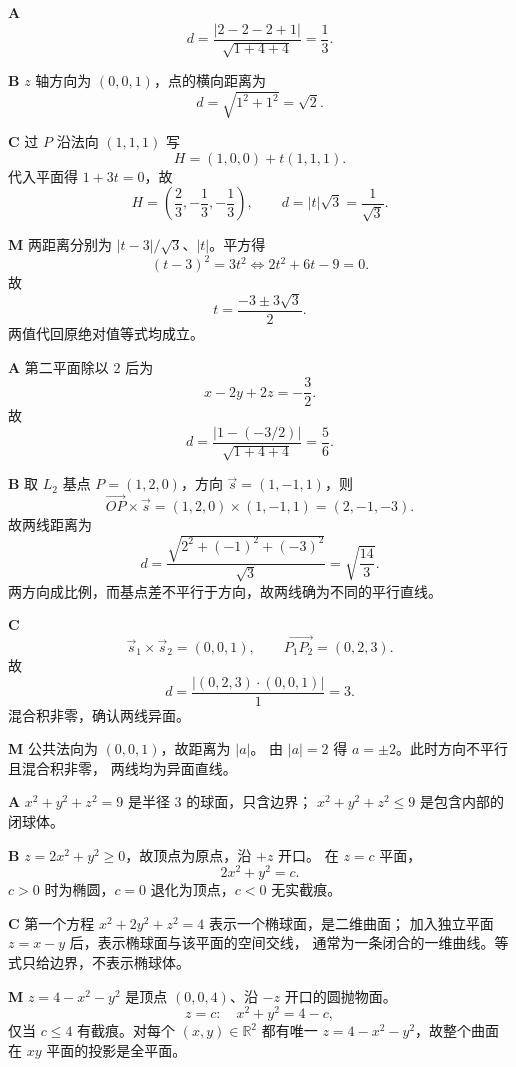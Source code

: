 \begin{solutionBox}
\textbf{A}\quad
\[
d=\frac{|2-2-2+1|}{\sqrt{1+4+4}}=\frac13.
\]

\textbf{B}\quad
\(z\) 轴方向为 \((0,0,1)\)，点的横向距离为
\[
d=\sqrt{1^2+1^2}=\sqrt2.
\]

\textbf{C}\quad
过 \(P\) 沿法向 \((1,1,1)\) 写
\[
H=(1,0,0)+t(1,1,1).
\]
代入平面得 \(1+3t=0\)，故
\[
H=\left(\frac23,-\frac13,-\frac13\right),\qquad
d=|t|\sqrt3=\frac1{\sqrt3}.
\]

\textbf{M}\quad
两距离分别为 \(|t-3|/\sqrt3\)、\(|t|\)。平方得
\[
(t-3)^2=3t^2
\Longleftrightarrow 2t^2+6t-9=0.
\]
故
\[
t=\frac{-3\pm3\sqrt3}{2}.
\]
两值代回原绝对值等式均成立。
\end{solutionBox}

\begin{solutionBox}
\textbf{A}\quad
第二平面除以 \(2\) 后为
\[
x-2y+2z=-\frac32.
\]
故
\[
d=\frac{|1-(-3/2)|}{\sqrt{1+4+4}}=\frac56.
\]

\textbf{B}\quad
取 \(L_2\) 基点 \(P=(1,2,0)\)，方向
\(\vec s=(1,-1,1)\)，则
\[
\overrightarrow{OP}\times\vec s
=(1,2,0)\times(1,-1,1)=(2,-1,-3).
\]
故两线距离为
\[
d=\frac{\sqrt{2^2+(-1)^2+(-3)^2}}{\sqrt3}
=\sqrt{\frac{14}{3}}.
\]
两方向成比例，而基点差不平行于方向，故两线确为不同的平行直线。

\textbf{C}\quad
\[
\vec s_1\times\vec s_2=(0,0,1),\qquad
\overrightarrow{P_1P_2}=(0,2,3).
\]
故
\[
d=\frac{|(0,2,3)\cdot(0,0,1)|}{1}=3.
\]
混合积非零，确认两线异面。

\textbf{M}\quad
公共法向为 \((0,0,1)\)，故距离为 \(|a|\)。
由 \(|a|=2\) 得 \(a=\pm2\)。此时方向不平行且混合积非零，
两线均为异面直线。
\end{solutionBox}

\begin{solutionBox}
\textbf{A}\quad
\(x^2+y^2+z^2=9\) 是半径 \(3\) 的球面，只含边界；
\(x^2+y^2+z^2\le9\) 是包含内部的闭球体。

\textbf{B}\quad
\(z=2x^2+y^2\ge0\)，故顶点为原点，沿 \(+z\) 开口。
在 \(z=c\) 平面，
\[
2x^2+y^2=c.
\]
\(c>0\) 时为椭圆，\(c=0\) 退化为顶点，\(c<0\) 无实截痕。

\textbf{C}\quad
第一个方程
\(x^2+2y^2+z^2=4\) 表示一个椭球面，是二维曲面；
加入独立平面 \(z=x-y\) 后，表示椭球面与该平面的空间交线，
通常为一条闭合的一维曲线。等式只给边界，不表示椭球体。

\textbf{M}\quad
\(z=4-x^2-y^2\) 是顶点 \((0,0,4)\)、沿 \(-z\) 开口的圆抛物面。
\[
z=c:\quad x^2+y^2=4-c,
\]
仅当 \(c\le4\) 有截痕。对每个 \((x,y)\in\mathbb R^2\) 都有唯一
\(z=4-x^2-y^2\)，故整个曲面在 \(xy\) 平面的投影是全平面。
\end{solutionBox}

